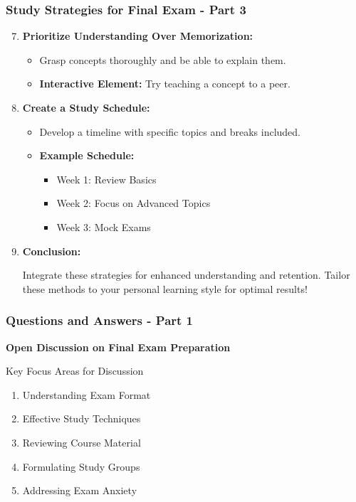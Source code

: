 \documentclass{beamer}
\begin{document}
\begin{frame}[fragile]
    \frametitle{Study Strategies for Final Exam - Part 3}
    \begin{enumerate}
        \setcounter{enumi}{6}
        \item \textbf{Prioritize Understanding Over Memorization:}
            \begin{itemize}
                \item Grasp concepts thoroughly and be able to explain them.
                \item \textbf{Interactive Element:} Try teaching a concept to a peer.
            \end{itemize}
        
        \item \textbf{Create a Study Schedule:}
            \begin{itemize}
                \item Develop a timeline with specific topics and breaks included.
                \item \textbf{Example Schedule:}
                    \begin{itemize}
                        \item Week 1: Review Basics
                        \item Week 2: Focus on Advanced Topics
                        \item Week 3: Mock Exams
                    \end{itemize}
            \end{itemize}
        
        \item \textbf{Conclusion:}
            \begin{block}{}
                Integrate these strategies for enhanced understanding and retention.
                Tailor these methods to your personal learning style for optimal results!
            \end{block}
    \end{enumerate}
\end{frame}

\begin{frame}[fragile]
    \frametitle{Questions and Answers - Part 1}
    \textbf{Open Discussion on Final Exam Preparation}

    \begin{block}{Key Focus Areas for Discussion}
        \begin{enumerate}
            \item Understanding Exam Format
            \item Effective Study Techniques
            \item Reviewing Course Material
            \item Formulating Study Groups
            \item Addressing Exam Anxiety
        \end{enumerate}
    \end{block}
\end{frame}
\end{document}
